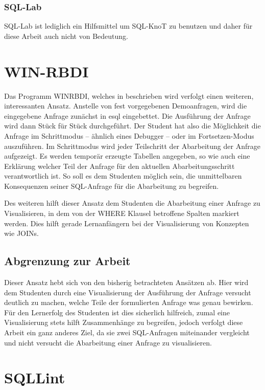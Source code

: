 \subsubsection{SQL-Lab}

SQL-Lab ist lediglich ein Hilfsmittel um SQL-KnoT zu benutzen und daher für diese Arbeit auch nicht von Bedeutung. 

\section{WIN-RBDI}

Das Programm WINRBDI, welches in \cite{winrbdi1} beschrieben wird verfolgt einen weiteren, interessanten Ansatz. Anstelle von fest vorgegebenen Demoanfragen, wird die eingegebene Anfrage zunächst in esql eingebettet. Die Ausführung der Anfrage wird dann Stück für Stück durchgeführt. Der Student hat also die Möglichkeit die Anfrage im Schrittmodus -- ähnlich eines Debugger -- oder im Fortsetzen-Modus auszuführen. Im Schrittmodus wird jeder Teilschritt der Abarbeitung der Anfrage aufgezeigt. Es werden temporär erzeugte Tabellen angegeben, so wie auch eine Erklärung welcher Teil der Anfrage für den aktuellen Abarbeitungsschritt verantwortlich ist. So soll es dem Studenten möglich sein, die unmittelbaren Konsequenzen seiner SQL-Anfrage für die Abarbeitung zu begreifen. 

Des weiteren hilft dieser Ansatz dem Studenten die Abarbeitung einer Anfrage zu Visualisieren, in dem von der WHERE Klausel betroffene Spalten markiert werden. Dies hilft gerade Lernanfängern bei der Visualisierung von Konzepten wie JOINs.

\subsection*{Abgrenzung zur Arbeit}

Dieser Ansatz hebt sich von den bisherig betrachteten Ansätzen ab. Hier wird dem Studenten durch eine Visualisierung der Ausführung der Anfrage versucht deutlich zu machen, welche Teile der formulierten Anfrage was genau bewirken. Für den Lernerfolg des Studenten ist dies sicherlich hilfreich, zumal eine Visualisierung stets hilft Zusammenhänge zu begreifen, jedoch verfolgt diese Arbeit ein ganz anderes Ziel, da sie zwei SQL-Anfragen miteinander vergleicht und nicht versucht die Abarbeitung einer Anfrage zu visualisieren.

\section{SQLLint}


